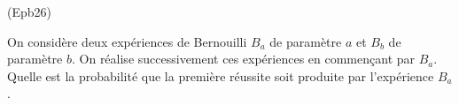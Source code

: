 \begin{tiny}(Epb26)\end{tiny} On considère deux expériences de Bernouilli $B_a$ de paramètre $a$ et $B_b$ de paramètre $b$. On réalise successivement ces expériences en commençant par $B_a$. Quelle est la probabilité que la première réussite soit produite par l'expérience $B_a$. 